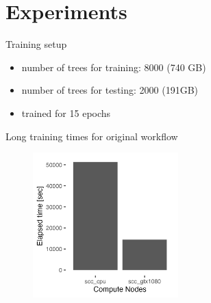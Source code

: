 \documentclass[compress,aspectratio=169]{beamer}
\begin{document}
\section{Experiments}
\sectionIntro %

\begin{frame}{Training setup}
\begin{itemize}
    \item number of trees for training: 8000 (740 GB)
    \vspace{1em}
    \item number of trees for testing: 2000 (191GB)
    \vspace{1em}
    \item trained for 15 epochs
\end{itemize}
\end{frame}


\begin{frame}{Long training times for original workflow}
    \begin{center}
    \begin{figure}
        \includegraphics[width=0.5\textwidth]{../../data/sacct_barplot_by_nodes_profiler-torch_sample-points}
    \end{figure}
    \end{center}
\end{frame}
\end{document}
